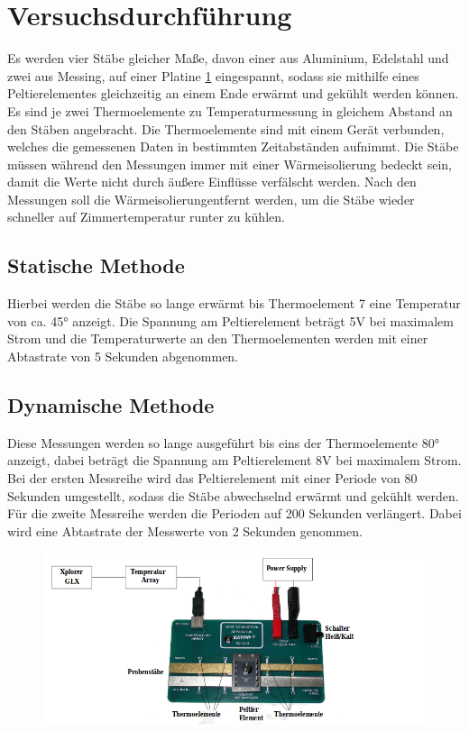 \documentclass[titlepage = firstcover]{scrartcl}
\begin{document}
  \section{Versuchsdurchführung}
    Es werden vier Stäbe gleicher Maße, davon einer aus Aluminium, Edelstahl und zwei aus Messing, auf einer Platine \ref{fig:platine}
    eingespannt, sodass sie mithilfe eines Peltierelementes gleichzeitig an einem Ende erwärmt und gekühlt werden können.
    Es sind je zwei Thermoelemente zu Temperaturmessung in gleichem Abstand an den Stäben angebracht. Die Thermoelemente
    sind mit einem Gerät verbunden, welches die gemessenen Daten in bestimmten Zeitabständen aufnimmt. Die Stäbe müssen
    während den Messungen immer mit einer Wärmeisolierung bedeckt sein, damit die Werte nicht durch äußere Einflüsse
    verfälscht werden. Nach den Messungen soll die Wärmeisolierungentfernt werden, um die Stäbe wieder schneller 
    auf Zimmertemperatur runter zu kühlen.
    \subsection{Statische Methode}
      Hierbei werden die Stäbe so lange erwärmt bis Thermoelement 7 eine Temperatur von ca. 45° anzeigt. Die Spannung
      am Peltierelement beträgt 5V bei maximalem Strom und die Temperaturwerte an den Thermoelementen werden mit einer
      Abtastrate von 5 Sekunden abgenommen.
    \subsection{Dynamische Methode}
      Diese Messungen werden so lange ausgeführt bis eins der Thermoelemente 80° anzeigt, dabei beträgt die Spannung am
      Peltierelement 8V bei maximalem Strom. Bei der ersten Messreihe wird das Peltierelement mit einer Periode von
      80 Sekunden umgestellt, sodass die Stäbe abwechselnd erwärmt und gekühlt werden. Für die zweite Messreihe werden
      die Perioden auf 200 Sekunden verlängert. Dabei wird eine Abtastrate der Messwerte von 2 Sekunden genommen.
    
    \begin{figure}[h]
      \centering
      \label{fig:platine}
      \includegraphics[width = 0.7\linewidth]{Platine.png}
    \end{figure}

    \FloatBarrier
\end{document}
